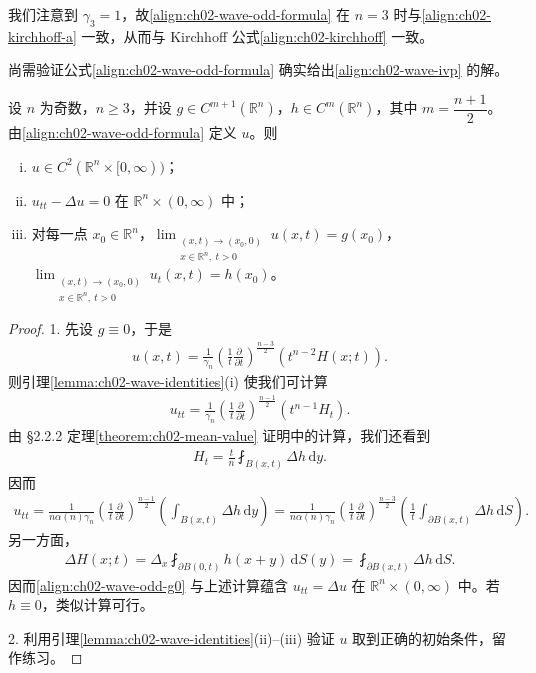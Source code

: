 \documentclass[../../main.tex]{subfiles}
\begin{document}
我们注意到 $\gamma_3=1$，故\eqref{align:ch02-wave-odd-formula} 在 $n=3$ 时与\eqref{align:ch02-kirchhoff-a} 一致，从而与 Kirchhoff 公式\eqref{align:ch02-kirchhoff} 一致。

尚需验证公式\eqref{align:ch02-wave-odd-formula} 确实给出\eqref{align:ch02-wave-ivp} 的解。

\begin{theorem}[奇数维波动方程的解]\label{theorem:ch02-wave-odd}设 $n$ 为奇数，$n\geqslant 3$，并设 $g\in C^{m+1}(\mathbb{R}^n)$，$h\in C^m(\mathbb{R}^n)$，其中 $m=\dfrac{n+1}{2}$。由\eqref{align:ch02-wave-odd-formula} 定义 $u$。则
\begin{enumerate}[(i)]
\item $u\in C^2(\mathbb{R}^n\times[0,\infty))$；
\item $u_{tt}-\Delta u=0$ 在 $\mathbb{R}^n\times(0,\infty)$ 中；
\item 对每一点 $x_0\in\mathbb{R}^n$，$\displaystyle\lim_{\substack{(x,t)\to(x_0,0)\\x\in\mathbb{R}^n,\ t>0}}u(x,t)=g(x_0)$，$\displaystyle\lim_{\substack{(x,t)\to(x_0,0)\\x\in\mathbb{R}^n,\ t>0}}u_t(x,t)=h(x_0)$。
\end{enumerate}
\end{theorem}

\begin{proof}
1. 先设 $g\equiv 0$，于是
\begin{align}\label{align:ch02-wave-odd-g0}
u(x,t)=\frac{1}{\gamma_n}\left(\frac{1}{t}\frac{\partial}{\partial t}\right)^{\frac{n-3}{2}}(t^{n-2}H(x;t)).
\end{align}
则引理\cref{lemma:ch02-wave-identities}(i) 使我们可计算
\begin{align*}
u_{tt}=\frac{1}{\gamma_n}\left(\frac{1}{t}\frac{\partial}{\partial t}\right)^{\frac{n-1}{2}}(t^{n-1}H_t).
\end{align*}
由 \S2.2.2 定理\cref{theorem:ch02-mean-value} 证明中的计算，我们还看到
\begin{align*}
H_t=\frac{t}{n}\fint_{B(x,t)}\Delta h\,\mathrm{d}y.
\end{align*}
因而
\begin{align*}
u_{tt}=\frac{1}{n\alpha(n)\gamma_n}\left(\frac{1}{t}\frac{\partial}{\partial t}\right)^{\frac{n-1}{2}}\left(\int_{B(x,t)}\Delta h\,\mathrm{d}y\right)
=\frac{1}{n\alpha(n)\gamma_n}\left(\frac{1}{t}\frac{\partial}{\partial t}\right)^{\frac{n-3}{2}}\left(\frac{1}{t}\int_{\partial B(x,t)}\Delta h\,\mathrm{d}S\right).
\end{align*}
另一方面，
\begin{align*}
\Delta H(x;t)=\Delta_x\fint_{\partial B(0,t)}h(x+y)\,\mathrm{d}S(y)=\fint_{\partial B(x,t)}\Delta h\,\mathrm{d}S.
\end{align*}
因而\eqref{align:ch02-wave-odd-g0} 与上述计算蕴含 $u_{tt}=\Delta u$ 在 $\mathbb{R}^n\times(0,\infty)$ 中。若 $h\equiv 0$，类似计算可行。

2. 利用引理\cref{lemma:ch02-wave-identities}(ii)--(iii) 验证 $u$ 取到正确的初始条件，留作练习。
\end{proof}
\end{document}
